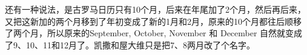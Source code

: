 还有一种说法，是古罗马日历只有10个月，后来在年尾加了2个月，然后再后来，
又把这新加的两个月移到了年初变成了新的1月和2月，原来的10个月都往后顺移
了两个月，所以原来的September, October, November 和 December 自然就变成
了9、10、11和12月了。凯撒和屋大维只是把7、8两月改了个名字。


